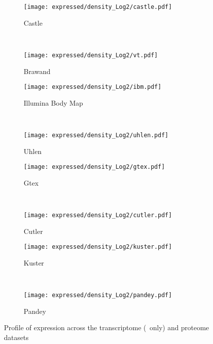 \begin{figure}
    \centering
    \begin{subfigure}[b]{0.35\textwidth}
        \centering \texttt{[image: expressed/density\_Log2/castle.pdf]}
        \caption{Castle}\label{fig:densityCastle_log2}
    \end{subfigure}%
~%
    \begin{subfigure}[b]{0.35\textwidth}
        \centering \texttt{[image: expressed/density\_Log2/vt.pdf]}
        \caption{Brawand}\label{fig:densityBrawand_log2}
    \end{subfigure}

    \begin{subfigure}[b]{0.35\textwidth}
        \centering \texttt{[image: expressed/density\_Log2/ibm.pdf]}
        \caption{Illumina Body Map}\label{fig:densityIBM_log2}
    \end{subfigure}%
~%
    \begin{subfigure}[b]{0.35\textwidth}
        \centering \texttt{[image: expressed/density\_Log2/uhlen.pdf]}
        \caption{Uhlen}\label{fig:densityUhlen_log2}
    \end{subfigure}

    \begin{subfigure}[b]{0.35\textwidth}
        \centering \texttt{[image: expressed/density\_Log2/gtex.pdf]}
        \caption{Gtex}\label{fig:densityGtex_log2}
    \end{subfigure}%
~%
    \begin{subfigure}[b]{0.35\textwidth}
        \centering \texttt{[image: expressed/density\_Log2/cutler.pdf]}
        \caption{Cutler}\label{fig:densityCutler_log2}
    \end{subfigure}

    \begin{subfigure}[b]{0.35\textwidth}
        \centering \texttt{[image: expressed/density\_Log2/kuster.pdf]}
        \caption{Kuster}\label{fig:densityKuster_log2}
    \end{subfigure}%
~%
    \begin{subfigure}[b]{0.35\textwidth}
        \centering \texttt{[image: expressed/density\_Log2/pandey.pdf]}
        \caption{Pandey}\label{fig:densityPandey_log2}
    \end{subfigure}
    \caption{Profile of expression across the transcriptome (\pcgs\ only)
    and proteome datasets}\label{fig:distribPlot}
\end{figure}

